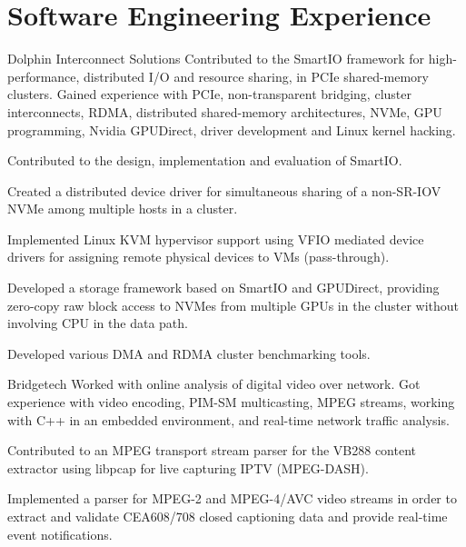 \section{Software Engineering Experience}
\begin{experience}{Dolphin Interconnect Solutions}{
}
Contributed to the SmartIO framework for high-performance, distributed I/O and resource sharing,
in PCIe shared-memory clusters. 
Gained experience with PCIe, non-transparent bridging, cluster interconnects, RDMA, distributed shared-memory
architectures, NVMe, GPU programming, Nvidia GPUDirect, driver development and Linux kernel hacking.

\begin{contribs}
	\item{Contributed to the design, implementation and evaluation of SmartIO.}
	\item{Created a distributed device driver for simultaneous sharing of a non-SR-IOV NVMe among multiple hosts in a cluster.}
	\item{Implemented Linux KVM hypervisor support using VFIO mediated device drivers
		for assigning remote physical devices to VMs (pass-through).}
	\item{Developed a storage framework based on SmartIO and GPUDirect, providing
		zero-copy raw block access to NVMes from multiple GPUs in the cluster without involving CPU in the data path.}
	\item{Developed various DMA and RDMA cluster benchmarking tools.}
\end{contribs}
\end{experience}

\begin{experience}{Bridgetech}{
}
Worked with online analysis of digital video over network.
Got experience with video encoding, PIM-SM multicasting, MPEG 
streams, working with C++ in an embedded environment, and
real-time network traffic analysis.

\begin{contribs}
	\item{Contributed to an MPEG transport stream parser for the VB288 content extractor using libpcap for live capturing
		IPTV (MPEG-DASH).}
	\item{Implemented a parser for MPEG-2 and MPEG-4/AVC video streams in order to extract and
		validate CEA608/708 closed captioning data and provide real-time event
		notifications.}
\end{contribs}
\end{experience}

